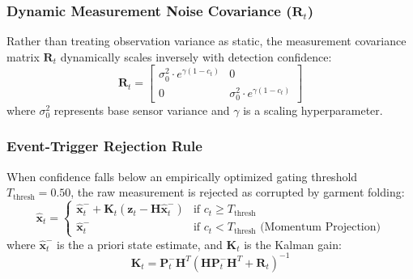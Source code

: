 \subsubsection{Dynamic Measurement Noise Covariance ($\mathbf{R}_t$)}
Rather than treating observation variance as static, the measurement covariance matrix $\mathbf{R}_t$ dynamically scales inversely with detection confidence:
\begin{equation}
    \mathbf{R}_t = \begin{bmatrix} \sigma_{0}^2 \cdot e^{\gamma(1 - c_t)} & 0 \\ 0 & \sigma_{0}^2 \cdot e^{\gamma(1 - c_t)} \end{bmatrix}
\end{equation}
where $\sigma_0^2$ represents base sensor variance and $\gamma$ is a scaling hyperparameter.

\subsubsection{Event-Trigger Rejection Rule}
When confidence falls below an empirically optimized gating threshold $T_{\text{thresh}} = 0.50$, the raw measurement is rejected as corrupted by garment folding:
\begin{equation}
    \hat{\mathbf{x}}_t = \begin{cases} 
    \hat{\mathbf{x}}_t^- + \mathbf{K}_t \left( \mathbf{z}_t - \mathbf{H}\hat{\mathbf{x}}_t^- \right) & \text{if } c_t \ge T_{\text{thresh}} \\
    \hat{\mathbf{x}}_t^- & \text{if } c_t < T_{\text{thresh}} \text{ (Momentum Projection)}
    \end{cases}
\end{equation}
where $\hat{\mathbf{x}}_t^-$ is the a priori state estimate, and $\mathbf{K}_t$ is the Kalman gain:
\begin{equation}
    \mathbf{K}_t = \mathbf{P}_t^- \mathbf{H}^T \left( \mathbf{H} \mathbf{P}_t^- \mathbf{H}^T + \mathbf{R}_t \right)^{-1}
\end{equation}
